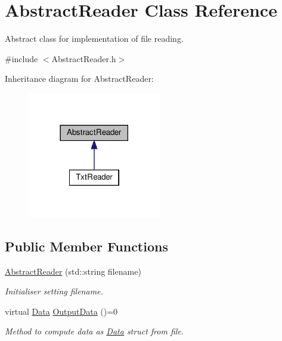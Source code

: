 \hypertarget{class_abstract_reader}{}\section{Abstract\+Reader Class Reference}
\label{class_abstract_reader}


Abstract class for implementation of file reading.  




{\ttfamily \#include $<$Abstract\+Reader.\+h$>$}



Inheritance diagram for Abstract\+Reader\+:\nopagebreak
\begin{figure}[H]
\begin{center}
\leavevmode
\includegraphics[width=165pt]{class_abstract_reader__inherit__graph}
\end{center}
\end{figure}
\subsection*{Public Member Functions}
\begin{DoxyCompactItemize}
\item 
\mbox{\label{class_abstract_reader_af7d4391a1d75538c6bb406c00acabd30}} 
\hyperlink{class_abstract_reader_af7d4391a1d75538c6bb406c00acabd30}{Abstract\+Reader} (std\+::string filename)
\begin{DoxyCompactList}\small\item\em Initialiser setting filename. \end{DoxyCompactList}\item 
virtual \hyperlink{struct_data}{Data} \hyperlink{class_abstract_reader_a14b05f156920be0cfa0cabdb1c6c1267}{Output\+Data} ()=0
\begin{DoxyCompactList}\small\item\em Method to compute data as \hyperlink{struct_data}{Data} struct from file. \end{DoxyCompactList}\end{DoxyCompactItemize}
